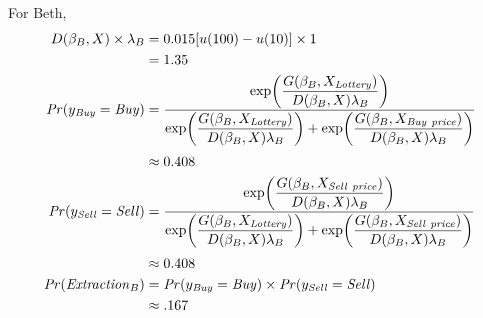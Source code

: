 \documentclass[../main.tex]{subfiles}
\begin{document}
\noindent For Beth,
\begin{align}
	\label{eq2:Beth}
	\begin{split}
	D(\beta_B,X) \times \lambda_B &= 0.015[u(100) - u(10)] \times 1\\
	&= 1.35 \\
	{\mathit{Pr}}(y_{\mathit{Buy}} = \mathit{Buy}) &=\dfrac{\exp\!\left( \dfrac{ G(\beta_B,X_{\mathit{Lottery}}) }{ D(\beta_B,X)\lambda_B }  \right)}{ \exp\!\left( \dfrac{ G(\beta_B,X_{\mathit{Lottery}}) }{ D(\beta_B,X)\lambda_B }  \right) + \exp\!\left( \dfrac{ G(\beta_B,X_{\mathit{Buy\ price}}) }{ D(\beta_B,X)\lambda_B }  \right)  }\\[0.5ex]
	&\approx 0.408 \\
	{\mathit{Pr}}(y_{\mathit{Sell}} = \mathit{Sell}) &=\dfrac{\exp\!\left( \dfrac{ G(\beta_B,X_{\mathit{Sell\ price}}) }{ D(\beta_B,X)\lambda_B }  \right)}{ \exp\!\left( \dfrac{ G(\beta_B,X_{\mathit{Lottery}}) }{ D(\beta_B,X)\lambda_B }  \right) + \exp\!\left( \dfrac{ G(\beta_B,X_{\mathit{Sell\ price}}) }{ D(\beta_B,X)\lambda_B }  \right)  }\\[0.5ex]
	&\approx 0.408 \\
	{\mathit{Pr}}(\mathit{Extraction}_B) &= {\mathit{Pr}}(y_{\mathit{Buy}} = \mathit{Buy}) \times {\ensuremath{\mathit{Pr}}}(y_{\mathit{Sell}} = \mathit{Sell})\\
	&\approx .167
	\end{split}
\end{align}
\end{document}
